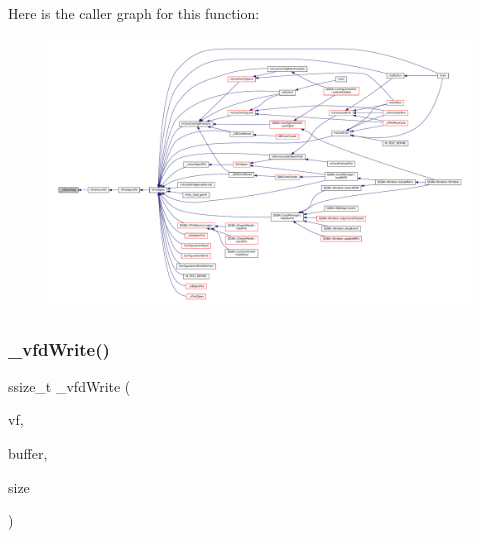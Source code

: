 Here is the caller graph for this function\+:
\nopagebreak
\begin{figure}[H]
\begin{center}
\leavevmode
\includegraphics[width=350pt]{vfs-fd_8c_a4e580a8cc60f9640c03ed89a67da646d_icgraph}
\end{center}
\end{figure}
\mbox{\label{vfs-fd_8c_a9f8dcc1c16660034ac0746b80f9c0c21}} 
\subsubsection{\texorpdfstring{\+\_\+vfd\+Write()}{\_vfdWrite()}}
{\footnotesize\ttfamily ssize\+\_\+t \+\_\+vfd\+Write (\begin{DoxyParamCaption}\item[{struct V\+File $\ast$}]{vf,  }\item[{const void $\ast$}]{buffer,  }\item[{size\+\_\+t}]{size }\end{DoxyParamCaption})\hspace{0.3cm}{\ttfamily [static]}}


